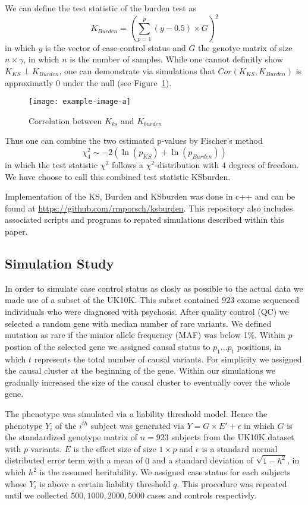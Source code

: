 We can define the test statistic of the burden test as 
\begin{equation}
	K_{Burden} = {(\sum^p_{p=1} (y-0.5) \times G)}^2
\end{equation}
in which $y$ is the vector of case-control status and $G$ the genotye matrix of size $n \times \gamma$, in which $n$ is the number of samples.
While one cannot definitly show $K_{KS} \perp K_{Burden}$, one can demonstrate via simulations that $Cor(K_{KS},K_{Burden})$ is approximatly $0$ under the null (see Figure~\ref{fig:correlation}).
\begin{figure}[htpb]
	\centering
	\texttt{[image: example-image-a]}
	\caption{\label{fig:correlation} Correlation between $K_{ks}$ and $K_{burden}$}
\end{figure}
Thus one can combine the two estimated p-values by Fischer's method 
\begin{equation}
	\chi^2_4 \sim - 2 (\ln(p_{KS}) + \ln(p_{Burden}))
\end{equation}
in which the test statistic $\chi^2$ follows a $\chi^2$-distribution with $4$ degrees of freedom.
We have choose to call this combined test statistic KSburden.

Implementation of the KS, Burden and KSburden was done in c++ and can be found at \url{https://github.com/rmporsch/ksburden}.
This repository also includes associated scripts and programs to repated simulations described within this paper.

\subsection{Simulation Study}
\label{sub:simulation_study}

In order to simulate case control status as closly as possible to the actual data we made use of a subset of the UK10K.
This subset contained $923$ exome sequenced individuals who were diagnosed with psychosis.
After quality control (QC) we selected a random gene with median number of rare variants.
We defined mutation as rare if the minior allele frequency (MAF) was below 1\%. 
Within $p$ postion of the selected gene we assigned causal status to $p_1 \ldots p_t$ positions, in which $t$ represents the total number of causal variants.
For simplicity we assigned the causal cluster at the beginning of the gene.
Within our simulations we gradually increased the size of the causal cluster to eventually cover the whole gene. 

The phenotype was simulated via a liability threshold model.
Hence the phenotype $Y_i$ of the $i^{th}$ subject was generated via
$Y = G\times E' + \epsilon$
in which $G$ is the standardized genotype matrix of $n=923$ subjects from the UK10K dataset with $p$ variants.
$E$ is the effect size of size $1\times p$ and $\epsilon$ is a standard normal distributed error term with a mean of $0$ and a standard deviation of $\sqrt{1-h^2}$, in which $h^2$ is the assumed heritability.
We assigned case status for each subjects whose $Y_i$ is above a certain liability threshold $q$.
This procedure was repeated until we collected $500,1000,2000,5000$ cases and controls respectivly.

